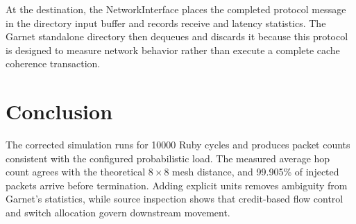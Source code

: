 \documentclass[11pt,a4paper]{article}
\begin{document}
At the destination, the NetworkInterface places the completed protocol message
in the directory input buffer and records receive and latency statistics. The
Garnet standalone directory then dequeues and discards it because this protocol
is designed to measure network behavior rather than execute a complete cache
coherence transaction.

\section{Conclusion}

The corrected simulation runs for 10000 Ruby cycles and produces packet counts
consistent with the configured probabilistic load. The measured average hop
count agrees with the theoretical $8\times8$ mesh distance, and 99.905\% of
injected packets arrive before termination. Adding explicit units removes
ambiguity from Garnet's statistics, while source inspection shows that
credit-based flow control and switch allocation govern downstream movement.
\end{document}
